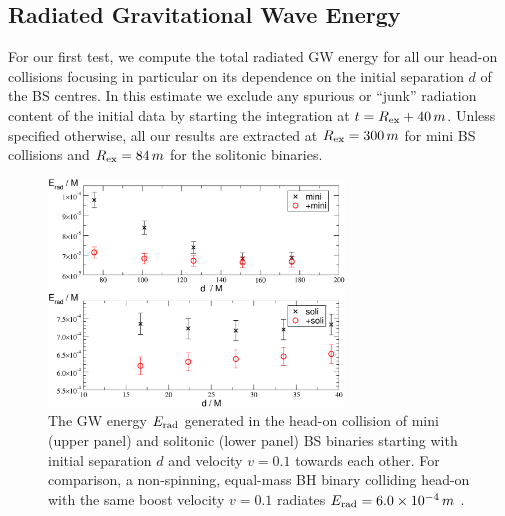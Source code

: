\subsection{Radiated Gravitational Wave Energy}
%
For our first test, we compute the total radiated
GW energy for all our head-on collisions focusing
in particular on its dependence on the initial separation
$d$ of the BS centres. In this estimate we exclude
any spurious or ``junk'' radiation content
of the initial data by starting the integration
at $t=R_{\rm ex}+40\,m$. Unless specified otherwise,
all our results are extracted at $R_{\rm ex}=300\,m$ for
mini BS collisions and $R_{\rm ex}=84\,m$ for the
solitonic binaries.
%
\begin{figure}
    \centering
    \includegraphics[width=0.7\textwidth]{malaise_source/erad.pdf}
    \caption{The GW energy $E_{\rm rad}$ generated in
    the head-on collision of mini (upper panel) and solitonic (lower panel) BS binaries starting
    with initial separation $d$ and velocity $v=0.1$ towards
    each other.
    For comparison, a non-spinning, equal-mass BH binary
    colliding head-on with the same boost velocity $v=0.1$ radiates $E_{\rm rad}=6.0\times 10^{-4}\,m$
    \cite{Sperhake:2019oaw}.
    } 
    \label{mal:fig:erad}
\end{figure}
%

